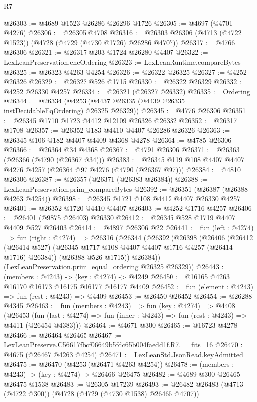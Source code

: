 \begin{lexlean}{R7}
\begin{coremodule}
@26303 := @4689 @1523 @26286 @26296 @1726
@26305 := @4697 (@4701 @4276)
@26306 := @26305 @4708
@26316 := @26303 @26306 (@4713 (@4722 @1523)) (@4728 (@4729 (@4730 @1726) @26286 @4707))
@26317 := @4766 @26306
@26321 := @26317 @203 @1724 @26280 @4407
@26322 := LexLeanPreservation.encOrdering
@26323 := LexLeanRuntime.compareBytes
@26325 := @26323 @4263 @4254
@26326 := @26322 @26325
@26327 := @4252 @26326
@26329 := @26323 @526 @1715
@26330 := @26322 @26329
@26332 := @4252 @26330 @4257
@26334 := @26321 (@26327 @26332)
@26335 := Ordering
@26344 := @26334 (@4253 (@4437 @26335 (@4439 @26335 instDecidableEqOrdering) @26325 @26329))
@26345 := @4776 @26306
@26351 := @26345 @1710 @1723 @4412 @12109 @26326 @26332
@26352 := @26317 @1708
@26357 := @26352 @183 @4410 @4407 @26286 @26326
@26363 := @26345 @106 @182 @4407 @4409 @4368 @4278
@26364 := @4785 @26306
@26366 := @26364 @34 @4368
@26367 := @4791 @26306
@26371 := @26363 (@26366 (@4790 (@26367 @34)))
@26383 := @26345 @119 @108 @4407 @4407 @4276 @4257 (@26364 @97 @4276 (@4790 (@26367 @97)))
@26384 := @4810 @26306
@26387 := @26357 (@26371 (@26383 @26384))
@26388 := LexLeanPreservation.prim_compareBytes
@26392 := @26351 (@26387 (@26388 @4263 @4254))
@26398 := @26345 @1721 @108 @4412 @4407 @26330 @4257
@26401 := @26352 @1720 @4410 @4407
@26403 := @4252 @1716 @4257
@26406 := @26401 (@9875 @26403) @26330
@26412 := @26345 @528 @1719 @4407 @4409 @527 @26403
@26414 := @4897 @26306 @22
@26441 := fun (left : @4274) =>
  fun (right : @4274) =>
  @26316
    (@26344
      (@26392
        (@26398
          (@26406
            (@26412 (@26414 @527) (@26345 @1717 @108 @4407 @4407 @1716 @4257 (@26414 @1716) @26384))
            (@26388 @526 @1715))
          @26384))
      (LexLeanPreservation.prim_equal_ordering @26325 @26329))
@26443 := (members : @4243) -> (key : @4274) -> @4249
@26450 := @16165 @4263 @16170 @16173 @16175 @16177 @16177 @4409
@26452 := fun (element : @4243) => fun (rest : @4243) => @4409
@26453 := @26450 @26452
@26454 := @26288 @4345
@26463 := fun (members : @4243) =>
  fun (key : @4274) =>
  @4408
    (@26453
      (fun (last : @4274) => fun (inner : @4243) => fun (rest : @4243) => @4411 (@26454 @4383)))
@26464 := @4671 @300
@26465 := @16723 @4278
@26466 := @26464 @26465
@26467 := LexLeanPreserve.C56617fbcf06649b5fdc65b004faedd1f.R7.__fits_16
@26470 := @4675 (@26467 @4263 @4254)
@26471 := LexLeanStd.JsonRead.keyAdmitted
@26475 := @26470 (@4253 (@26471 @4263 @4254))
@26478 := (members : @4243) -> (key : @4274) -> @26466 @26475
@26482 := @4689 @300 @26465 @26475 @1538
@26483 := @26305 @17239
@26493 := @26482 @26483 (@4713 (@4722 @300)) (@4728 (@4729 (@4730 @1538) @26465 @4707))

\end{coremodule}
\end{lexlean}
